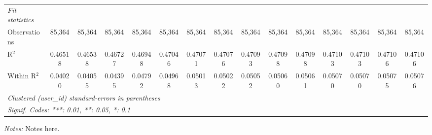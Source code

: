 \begin{table}[htbp]
\begin{tabular}{lcccccccccccccc}
      \midrule \emph{Fit statistics} &   &   &   &   &   &   &   &   &   &   &   &   &   &  \\
      Observations             & 85,364          & 85,364          & 85,364          & 85,364          & 85,364          & 85,364          & 85,364          & 85,364          & 85,364          & 85,364          & 85,364          & 85,364          & 85,364          & 85,364\\
      R$^2$                    & 0.46518         & 0.46538         & 0.46727         & 0.46948         & 0.47046         & 0.47071         & 0.47076         & 0.47093         & 0.47098         & 0.47098         & 0.47103         & 0.47103         & 0.47106         & 0.47106\\
      Within R$^2$             & 0.04020         & 0.04055         & 0.04395         & 0.04792         & 0.04968         & 0.05013         & 0.05022         & 0.05052         & 0.05060         & 0.05061         & 0.05070         & 0.05070         & 0.05075         & 0.05076\\
      \midrule\midrule\multicolumn{15}{l}{\emph{Clustered (user\_id) standard-errors in parentheses}}\\
      \multicolumn{15}{l}{\emph{Signif. Codes: ***: 0.01, **: 0.05, *: 0.1}}\\
   \end{tabular}
   
   \medskip \emph{Notes:} Notes here.
\end{table}


